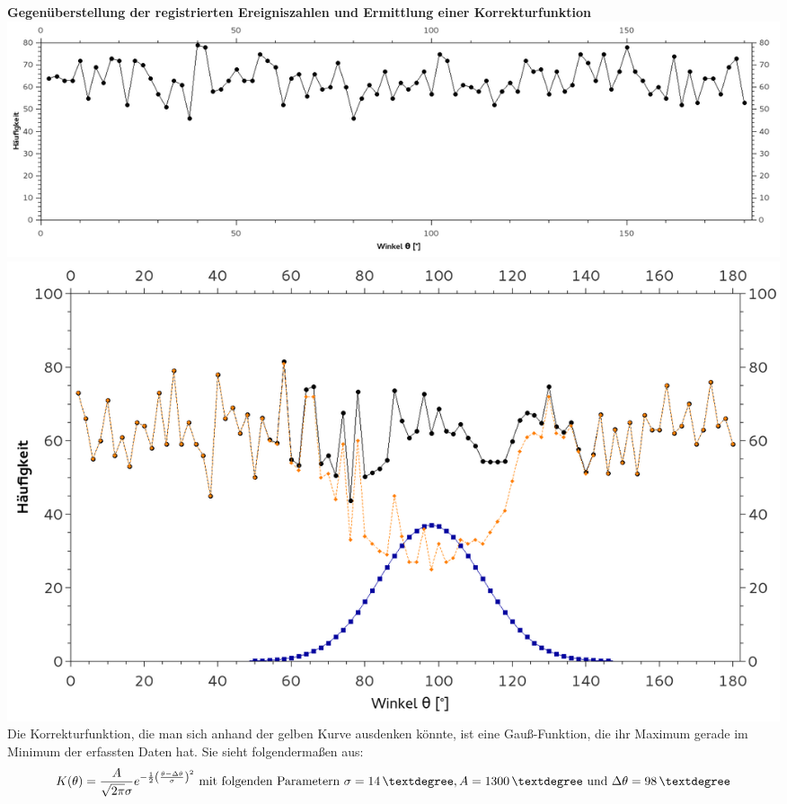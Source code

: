         \textbf{Gegenüberstellung der registrierten Ereigniszahlen und Ermittlung einer Korrekturfunktion}\\
        
        \centering \includegraphics[width=.72\textwidth, height=0.225\textheight]{pic/isotropie.png}
        \centering \includegraphics[width=.75\textwidth, height=0.25\textheight]{pic/KorrekturderAnisotropie.png}
        \flushleft
        Die Korrekturfunktion, die man sich anhand der gelben Kurve ausdenken könnte, ist eine Gauß-Funktion, die ihr Maximum gerade im Minimum der erfassten Daten hat.
        Sie sieht folgendermaßen aus:
        \begin{equation*}
            K(\theta) = \frac{A}{\sqrt{2\pi}\sigma} e^{-\frac{1}{2}\left(\frac{\theta - \Delta \theta}{\sigma}\right)^2} \text{ mit folgenden Parametern } \sigma=\unit[14]{\textdegree}, A=\unit[1300]{\textdegree} \text{ und } \Delta \theta = \unit[98]{\textdegree}
        \end{equation*}
        
